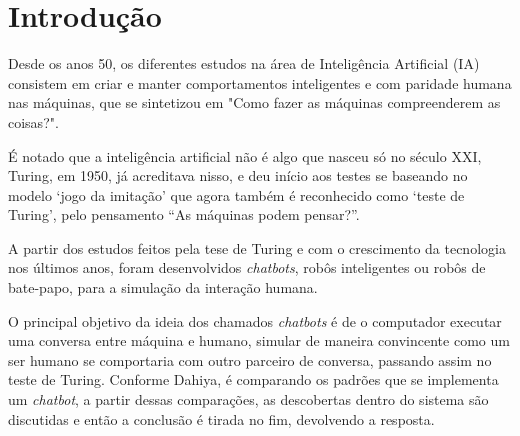 \documentclass[
	12pt,				%
	oneside,
	a4paper,			%
	english,			%
	french,				%
	spanish,			%
	brazil				%
	]{abntex2}
\begin{document}

\tableofcontents*
\cleardoublepage



\textual

\chapter{Introdução}
Desde os anos 50, os diferentes estudos na área de Inteligência Artificial (IA) consistem em criar e manter comportamentos inteligentes e com paridade humana nas máquinas, que se sintetizou em "Como fazer as máquinas compreenderem as coisas?"\supercite{minsky}.

É notado que a inteligência artificial não é algo que nasceu só no século XXI, Turing, em 1950, já acreditava nisso, e deu início aos testes se baseando no modelo ‘jogo da imitação’ que agora também é reconhecido como ‘teste de Turing’, pelo pensamento “As máquinas podem pensar?”.

A partir dos estudos feitos pela tese de Turing e com o crescimento da tecnologia nos últimos anos, foram desenvolvidos \emph{chatbots}, robôs inteligentes ou robôs de bate-papo, para a simulação da interação humana. 

O principal objetivo da ideia dos chamados \emph{chatbots} é de o computador executar uma conversa entre máquina e humano, simular de maneira convincente como um ser humano se comportaria com outro parceiro de conversa, passando assim no teste de Turing.  
Conforme Dahiya\supercite{dahiya}, é comparando os padrões que se implementa um \emph{chatbot}, a partir dessas comparações, as descobertas dentro do sistema são discutidas e então a conclusão é tirada no fim, devolvendo a resposta.
 
\end{document}
